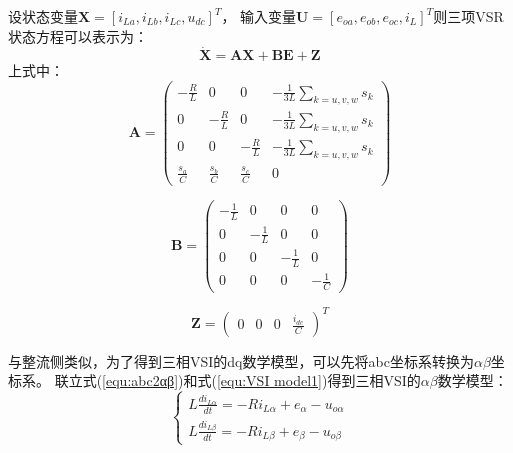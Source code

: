 设状态变量$\boldsymbol{X}=[i_{La},i_{Lb},i_{Lc},u_{dc}]^{T}$，
输入变量$\boldsymbol{U}=[e_{oa},e_{ob},e_{oc},i_{L}]^{T}$则三项VSR状态方程可以表示为：
\begin{equation}
	\boldsymbol{\dot{X}}=\boldsymbol{A}\boldsymbol{X}+\boldsymbol{B}\boldsymbol{E}+\boldsymbol{Z}
\end{equation}
上式中：
\begin{equation}
	\boldsymbol{A}=
	\begin{pmatrix}
		-\frac{R}{L}    & 0               & 0               & - \frac{1}{3L} \sum\limits_{k=u,v,w} s_{k} \\
		0               & -\frac{R}{L}    & 0               & - \frac{1}{3L} \sum\limits_{k=u,v,w} s_{k} \\
		0               & 0               & -\frac{R}{L}    & - \frac{1}{3L} \sum\limits_{k=u,v,w} s_{k} \\
		\frac{s_{a}}{C} & \frac{s_{b}}{C} & \frac{s_{c}}{C} & 0
	\end{pmatrix}
\end{equation}

\begin{equation}
	\boldsymbol{B}=
	\begin{pmatrix}
		-\frac{1}{L} & 0            & 0            & 0            \\
		0            & -\frac{1}{L} & 0            & 0            \\
		0            & 0            & -\frac{1}{L} & 0            \\
		0            & 0            & 0            & -\frac{1}{C}
	\end{pmatrix}
\end{equation}

\begin{equation}
	\boldsymbol{Z}=
	\begin{pmatrix}
		0 & 0 & 0 & \frac{i_{dc}}{C}
	\end{pmatrix}^{T}
\end{equation}

与整流侧类似，为了得到三相VSI的dq数学模型，可以先将abc坐标系转换为$\alpha\beta$坐标系。
联立式(\ref{equ:abc2αβ})和式(\ref{equ:VSI model1})得到三相VSI的$\alpha\beta$数学模型：
\begin{equation}
	\begin{cases}
		L\frac{di_{L\alpha}}{dt}=-Ri_{L\alpha}+e_{\alpha}-u_{o\alpha} \\
		L\frac{di_{L\beta}}{dt}=-Ri_{L\beta}+e_{\beta}-u_{o\beta}
	\end{cases}
	\label{equ:VSI αβ model1}
\end{equation}

